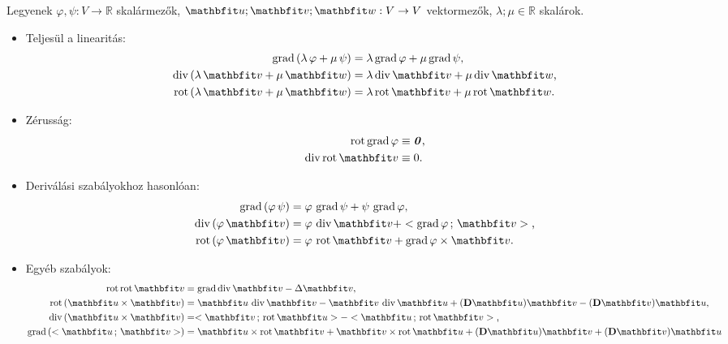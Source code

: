 \documentclass[lang=magyar]{math-handout}
\begin{document}
Legyenek $\varphi, \psi: V \rightarrow \mathbb R$ skalármezők, $\rvec u;
  \rvec v; \rvec w: V \rightarrow V$ vektormezők, $\lambda; \mu \in \mathbb R$
skalárok.
\begin{itemize}
  \item Teljesül a linearitás:\vspace{-.33cm}
        \begin{align*}
          \grad \left( \lambda \, \varphi + \mu \, \psi \right)
           & =
          \lambda \grad \varphi + \mu \grad \psi
          \text,
          \\
          \Div \left( \lambda \, \rvec v + \mu \, \rvec w \right)
           & =
          \lambda \Div \rvec v + \mu \Div \rvec w
          \text,
          \\
          \rot \left( \lambda \, \rvec v + \mu \, \rvec w \right)
           & =
          \lambda \rot \rvec v + \mu \rot \rvec w
          \text.
        \end{align*}
  \item Zérusság:\vspace{-.33cm}
        \begin{align*}
          \rot \grad \varphi & \equiv \nvec
          \text,
          \\
          \Div \rot \rvec v  & \equiv 0
          \text.
        \end{align*}
  \item Deriválási szabályokhoz hasonlóan:
        \begin{align*}
          \grad \left( \varphi \, \psi \right)
           & =
          \varphi \, \grad \psi + \psi \, \grad \varphi
          \text,
          \\
          \Div \left( \varphi \, \rvec v \right)
           & =
          \varphi \, \Div \rvec v + \scalar{\grad \varphi}{\rvec v}
          \text,
          \\
          \rot \left( \varphi \, \rvec v \right)
           & =
          \varphi \, \rot \rvec v + \grad \varphi \times \rvec v
          \text.
        \end{align*}
  \item Egyéb szabályok:\vspace{-.33cm}
        \begin{align*}
          \rot \rot \rvec v
           & =
          \grad \Div \rvec v - \Delta \rvec v
          \text,
          \\
          \rot \left( \rvec u \times \rvec v \right)
           & =
          \rvec u \, \Div \rvec v - \rvec v \, \Div \rvec u
          + (\Diff \rvec u) \rvec v - (\Diff \rvec v) \rvec u
          \text,
          \\
          \Div \left( \rvec u \times \rvec v \right)
           & =
          \scalar{\rvec v}{\rot \rvec u} - \scalar{\rvec u}{\rot \rvec v}
          \text,
          \\
          \grad \left( \scalar{\rvec u}{\rvec v} \right)
           & =
          \rvec u \times \rot \rvec v + \rvec v \times \rot \rvec u
          + (\Diff \rvec u) \rvec v + (\Diff \rvec v) \rvec u
        \end{align*}
\end{itemize}
\end{document}
